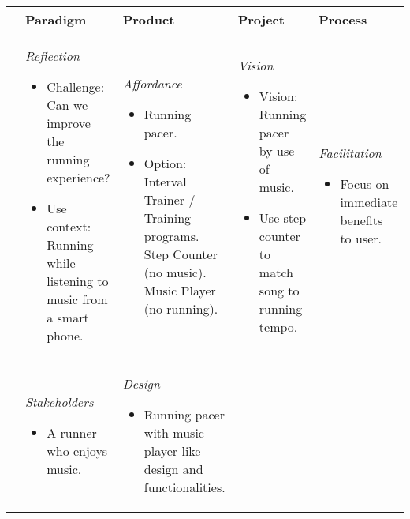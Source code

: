 \begin{table}
\footnotesize
\begin{tabular}{|l|l|l|l|l|} \hline
         & \textbf{Paradigm} & \textbf{Product} & \textbf{Project} & \textbf{Process} \\ \hline
\parbox[t][4cm][c]{0.02\textwidth}{} %
	& \parbox[t][][c]{0.20\textwidth}{ 
		\textit{Reflection}
		\begin{itemize}[leftmargin=*]
		\item Challenge: Can we improve the running experience?
		\item Use context: Running while listening to music from a smart phone.
		\end{itemize}
	}
	& \parbox[t][][c]{0.20\textwidth}{ 
		\textit{Affordance} 
		\begin{itemize}[leftmargin=*]
		\item Running pacer. 
		\item Option: 
			Interval Trainer / Training programs. \newline
			Step Counter (no music). \newline
			Music Player (no running). 
		\end{itemize}	 
	}
	& \parbox[t][][c]{0.20\textwidth}{  
		\textit{Vision} 
		\begin{itemize}[leftmargin=*]
		\item Vision: Running pacer by use of music. 
		\item Use step counter to match song to running tempo.
		\end{itemize}
	}
    & \parbox[t][][c]{0.20\textwidth}{ 
	    \textit{Facilitation}
   		\begin{itemize}[leftmargin=*]
		\item Focus on immediate benefits to user.
		\end{itemize}
   } \\ \hline
\parbox[t][5cm][c]{0.02\textwidth}{}
	& \parbox[t][][c]{0.20\textwidth}{ 
	    \textit{Stakeholders} 
		\begin{itemize}[leftmargin=*]
		\item A runner who enjoys music.
		\end{itemize}
	}
	& \parbox[t][][c]{0.20\textwidth}{ 
		\textit{Design} 
		\begin{itemize}[leftmargin=*]
		\item Running pacer with music player-like design and functionalities.  
		\end{itemize}
}
\end{tabular}
\end{table}
